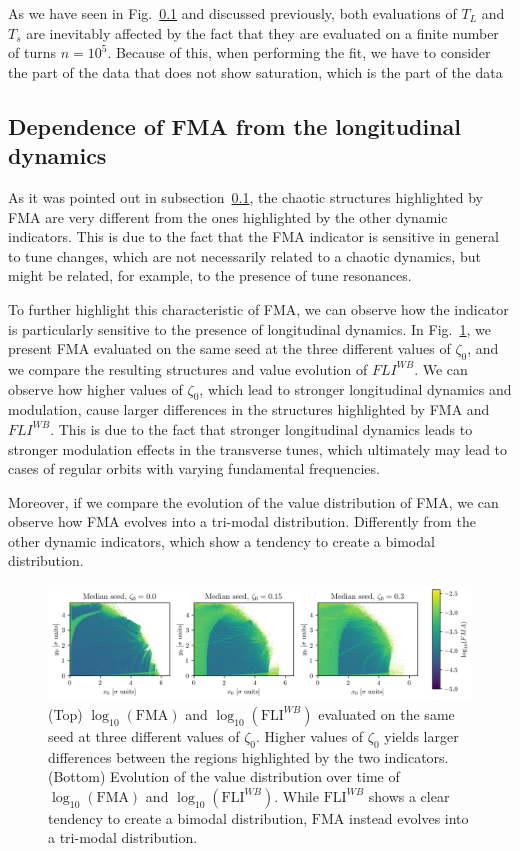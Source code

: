 As we have seen in Fig.~\ref{} and discussed previously, both evaluations of $T_L$ and $T_s$ are inevitably affected by the fact that they are evaluated on a finite number of turns $n=10^5$. Because of this, when performing the fit, we have to consider the part of the data that does not show saturation, which is the part of the data 

\subsection{Dependence of FMA from the longitudinal dynamics}

As it was pointed out in subsection~\ref{}, the chaotic structures highlighted by FMA are very different from the ones highlighted by the other dynamic indicators. This is due to the fact that the FMA indicator is sensitive in general to tune changes, which are not necessarily related to a chaotic dynamics, but might be related, for example, to the presence of tune resonances.

To further highlight this characteristic of FMA, we can observe how the indicator is particularly sensitive to the presence of longitudinal dynamics. In Fig.~\ref{fig:fma_vs_fli}, we present FMA evaluated on the same seed at the three different values of $\zeta_0$, and we compare the resulting structures and value evolution of $FLI^{WB}$. We can observe how higher values of $\zeta_0$, which lead to stronger longitudinal dynamics and modulation, cause larger differences in the structures highlighted by FMA and $FLI^{WB}$. This is due to the fact that stronger longitudinal dynamics leads to stronger modulation effects in the transverse tunes, which ultimately may lead to cases of regular orbits with varying fundamental frequencies.   

Moreover, if we compare the evolution of the value distribution of FMA, we can observe how FMA evolves into a tri-modal distribution. Differently from the other dynamic indicators, which show a tendency to create a bimodal distribution.

\begin{figure}[ht]
    \centering
    \includegraphics[width=1.0\textwidth]{6_lhc_dynamic_indicators/figs/FMA.png}
    \caption{(Top) $\log_{10}(\mathrm{FMA})$ and $\log_{10}(\mathrm{FLI}^{WB})$ evaluated on the same seed at three different values of $\zeta_0$. Higher values of $\zeta_0$ yields larger differences between the regions highlighted by the two indicators. (Bottom) Evolution of the value distribution over time of $\log_{10}(\mathrm{FMA})$ and $\log_{10}(\mathrm{FLI}^{WB})$. While $\mathrm{FLI}^{WB}$ shows a clear tendency to create a bimodal distribution, $\mathrm{FMA}$ instead evolves into a tri-modal distribution.}
    \label{fig:fma_vs_fli}
\end{figure}

